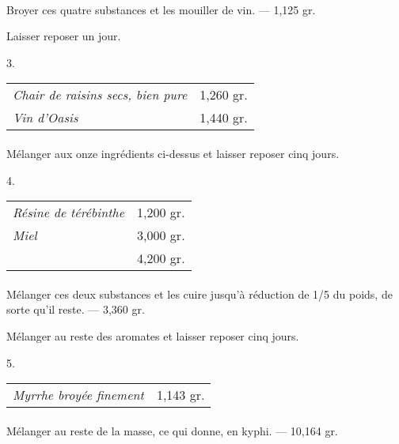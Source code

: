 \documentclass[a4paper, 11pt, oneside]{article}
\begin{document}
\paragraph{}
Broyer ces quatre substances et les mouiller de vin. --- 1,125 gr.

Laisser reposer un jour.
\begin{center}
3.
\end{center}
\begin{table}[H]
    \centering
    \begin{tabular}{l r}
        \emph{Chair de raisins secs, bien pure} & 1,260 gr. \\
        \emph{Vin d'Oasis} & 1,440 gr. \\
    \end{tabular}
\end{table}
\paragraph{}
Mélanger aux onze ingrédients ci-dessus et laisser reposer cinq jours.
\begin{center}
4.
\end{center}
\begin{table}[H]
    \centering
    \begin{tabular}{l r}
        \emph{Résine de térébinthe} & 1,200 gr. \\
        \emph{Miel} & 3,000 gr. \\ \hline
        ~ & 4,200 gr. \\
    \end{tabular}
\end{table}
\paragraph{}
Mélanger ces deux substances et les cuire jusqu'à réduction de 1/5 du poids, de sorte qu'il reste. --- 3,360 gr.

Mélanger au reste des aromates et laisser reposer cinq jours.
\begin{center}
5.
\end{center}
\begin{table}[H]
    \centering
    \begin{tabular}{l r}
        \emph{Myrrhe broyée finement} & 1,143 gr. \\
    \end{tabular}
\end{table}
\paragraph{}
Mélanger au reste de la masse, ce qui donne, en kyphi. --- 10,164 gr.
\end{document}
